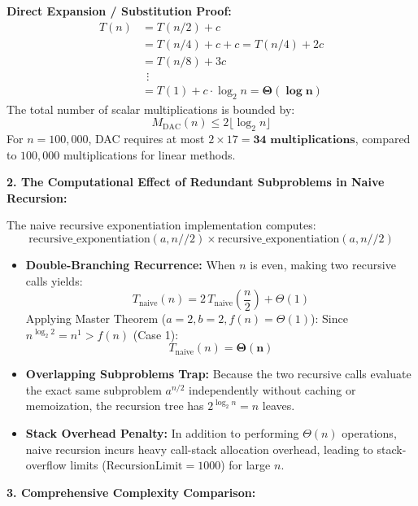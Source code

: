 \documentclass[12pt]{article}
\begin{document}
\textbf{Direct Expansion / Substitution Proof:}
\[
\begin{aligned}
T(n) &= T(n/2) + c \\
&= T(n/4) + c + c = T(n/4) + 2c \\
&= T(n/8) + 3c \\
&\ \ \vdots \\
&= T(1) + c \cdot \log_2 n = \mathbf{\Theta(\log n)}
\end{aligned}
\]
The total number of scalar multiplications is bounded by:
\[
M_{\text{DAC}}(n) \le 2 \lfloor \log_2 n \rfloor
\]
For $n = 100,000$, DAC requires at most $2 \times 17 = \mathbf{34\text{ multiplications}}$, compared to $100,000$ multiplications for linear methods.

\vspace{0.3cm}

\textbf{2. The Computational Effect of Redundant Subproblems in Naive Recursion:}

The naive recursive exponentiation implementation computes:
\[
\text{recursive\_exponentiation}(a, n//2) \times \text{recursive\_exponentiation}(a, n//2)
\]
\begin{itemize}
    \item \textbf{Double-Branching Recurrence:} When $n$ is even, making two recursive calls yields:
    \[
    T_{\text{naive}}(n) = 2\,T_{\text{naive}}\left(\frac{n}{2}\right) + \Theta(1)
    \]
    Applying Master Theorem ($a = 2, b = 2, f(n) = \Theta(1)$):
    Since $n^{\log_2 2} = n^1 > f(n)$ (Case 1):
    \[
    T_{\text{naive}}(n) = \mathbf{\Theta(n)}
    \]
    \item \textbf{Overlapping Subproblems Trap:} Because the two recursive calls evaluate the exact same subproblem $a^{n/2}$ independently without caching or memoization, the recursion tree has $2^{\log_2 n} = n$ leaves.
    \item \textbf{Stack Overhead Penalty:} In addition to performing $\Theta(n)$ operations, naive recursion incurs heavy call-stack allocation overhead, leading to stack-overflow limits ($\text{RecursionLimit} = 1000$) for large $n$.
\end{itemize}

\vspace{0.3cm}

\textbf{3. Comprehensive Complexity Comparison:}
\end{document}
